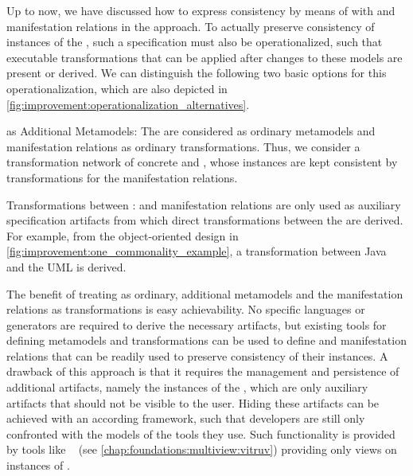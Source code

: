 Up to now, we have discussed how to express consistency by means of \conceptmetamodels with \commonalities and manifestation relations in the \commonalities approach.
To actually preserve consistency of instances of the \concretemetamodels, such a specification must also be operationalized, such that executable transformations that can be applied after changes to these models are present or derived.
We can distinguish the following two basic options for this operationalization, which are also depicted in \autoref{fig:improvement:operationalization_alternatives}.
\begin{properdescription}
    \item[\ConceptMetamodels as Additional Metamodels:] The \conceptmetamodels are considered as ordinary metamodels and manifestation relations as ordinary transformations. Thus, we consider a transformation network of concrete and \conceptmetamodels, whose instances are kept consistent by transformations for the manifestation relations.
    \item[Transformations between \ConcreteMetamodels:] \Conceptmetamodels and manifestation relations are only used as auxiliary specification artifacts from which direct transformations between the \concretemetamodels are derived. For example, from the object-oriented design \conceptmetamodel in \autoref{fig:improvement:one_commonality_example}, a transformation between Java and the \gls{UML} is derived.
\end{properdescription}

The benefit of treating \conceptmetamodels as ordinary, additional metamodels and the manifestation relations as transformations is easy achievability.
No specific languages or generators are required to derive the necessary artifacts, but existing tools for defining metamodels and transformations can be used to define \conceptmetamodels and manifestation relations that can be readily used to preserve consistency of their instances.
A drawback of this approach is that it requires the management and persistence of additional artifacts, namely the instances of the \conceptmetamodels, which are only auxiliary artifacts that should not be visible to the user.
Hiding these artifacts can be achieved with an according framework, such that developers are still only confronted with the models of the tools they use.
Such functionality is provided by tools like \vitruv~ (see \autoref{chap:foundations:multiview:vitruv}) providing only views on instances of \concretemetamodels.


